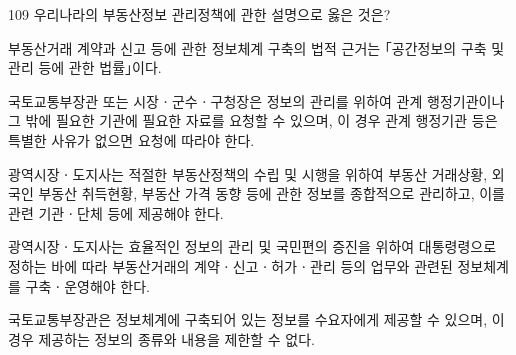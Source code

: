 \begin{question}{109}
우리나라의 부동산정보 관리정책에 관한 설명으로 옳은 것은?
\begin{choices}
  \item 부동산거래 계약과 신고 등에 관한 정보체계 구축의 법적 근거는 ｢공간정보의 구축 및 관리 등에 관한 법률｣이다.
  \item 국토교통부장관 또는 시장ㆍ군수ㆍ구청장은 정보의 관리를 위하여 관계 행정기관이나 그 밖에 필요한 기관에 필요한 자료를 요청할 수 있으며, 이 경우 관계 행정기관 등은 특별한 사유가 없으면 요청에 따라야 한다.
  \item 광역시장ㆍ도지사는 적절한 부동산정책의 수립 및 시행을 위하여 부동산 거래상황, 외국인 부동산 취득현황, 부동산 가격 동향 등에 관한 정보를 종합적으로 관리하고, 이를 관련 기관ㆍ단체 등에 제공해야 한다.
  \item 광역시장ㆍ도지사는 효율적인 정보의 관리 및 국민편의 증진을 위하여 대통령령으로 정하는 바에 따라 부동산거래의 계약ㆍ신고ㆍ허가ㆍ관리 등의 업무와 관련된 정보체계를 구축ㆍ운영해야 한다.
  \item 국토교통부장관은 정보체계에 구축되어 있는 정보를 수요자에게 제공할 수 있으며, 이 경우 제공하는 정보의 종류와 내용을 제한할 수 없다.
\end{choices}
\end{question}
